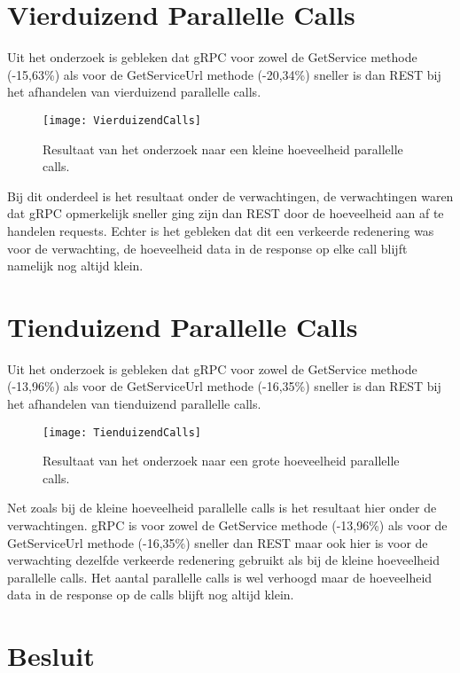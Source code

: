 \section{Vierduizend Parallelle Calls}
\label{sec:Vierduizend parallelle calls}
Uit het onderzoek is gebleken dat gRPC voor zowel de GetService methode (-15,63\%) als voor de GetServiceUrl methode (-20,34\%) sneller is dan REST bij het afhandelen van vierduizend parallelle calls.
\begin{figure}[H]
    \centering
    \texttt{[image: VierduizendCalls]}
    \caption[Resultaten van vierduizend parallelle calls]{Resultaat van het onderzoek naar een kleine hoeveelheid parallelle calls.}
    \label{fig:VierduizendCallsResult}
\end{figure}

Bij dit onderdeel is het resultaat onder de verwachtingen, de verwachtingen waren dat gRPC opmerkelijk sneller ging zijn dan REST door de hoeveelheid aan af te handelen requests. Echter is het gebleken dat dit een verkeerde redenering was voor de verwachting, de hoeveelheid data in de response op elke call blijft namelijk nog altijd klein.

\section{Tienduizend Parallelle Calls}
\label{sec:Tienduizend parallelle calls}
Uit het onderzoek is gebleken dat gRPC voor zowel de GetService methode (-13,96\%) als voor de GetServiceUrl methode (-16,35\%) sneller is dan REST bij het afhandelen van tienduizend parallelle calls.
\begin{figure}[H]
    \centering
    \texttt{[image: TienduizendCalls]}
    \caption[Resultaten van tienduizend parallelle calls]{Resultaat van het onderzoek naar een grote hoeveelheid parallelle calls.}
    \label{fig:TienduizendCallsResult}
\end{figure}

Net zoals bij de kleine hoeveelheid parallelle calls is het resultaat hier onder de verwachtingen. gRPC is voor zowel de GetService methode (-13,96\%) als voor de GetServiceUrl methode (-16,35\%) sneller dan REST maar ook hier is voor de verwachting dezelfde verkeerde redenering gebruikt als bij de kleine hoeveelheid parallelle calls. Het aantal parallelle calls is wel verhoogd maar de hoeveelheid data in de response op de calls blijft nog altijd klein.

\section{Besluit}
\label{sec:Besluit}


